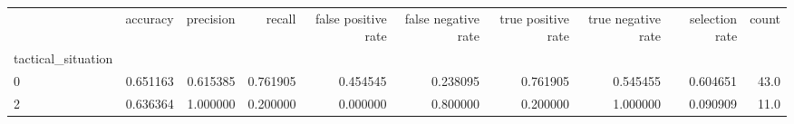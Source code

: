 \begin{tabular}{lrrrrrrrrr}
\toprule
{} &  accuracy &  precision &    recall &  false positive rate &  false negative rate &  true positive rate &  true negative rate &  selection rate &  count \\
tactical\_situation &           &            &           &                      &                      &                     &                     &                 &        \\
\midrule
0                  &  0.651163 &   0.615385 &  0.761905 &             0.454545 &             0.238095 &            0.761905 &            0.545455 &        0.604651 &   43.0 \\
2                  &  0.636364 &   1.000000 &  0.200000 &             0.000000 &             0.800000 &            0.200000 &            1.000000 &        0.090909 &   11.0 \\
\bottomrule
\end{tabular}
